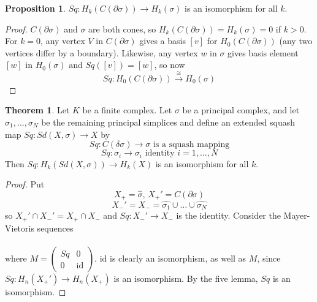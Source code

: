 \documentclass[a4paper,14pt]{extarticle}
\theoremstyle{definition}
\newtheorem*{theorem}{Theorem}
\newtheorem*{proposition}{Proposition}
\begin{document}
\begin{proposition}
	$Sq:H_k(C(\partial\sigma))\rightarrow H_k(\sigma)$ is an isomorphism for all $k$.
\end{proposition}

\begin{proof}
	$C(\partial\sigma)$ and $\sigma$ are both cones, so $H_k(C(\partial\sigma))=H_k(\sigma)=0$ if 
	$k>0$. For $k=0$, any vertex $V$ in $C(\partial\sigma)$ gives a basis $[v]$ for 
	$H_0(C(\partial\sigma))$ (any two vertices differ by a boundary). Likewise, any vertex $w$
	in $\sigma$ gives basis element $[w]$ in $H_0(\sigma)$ and $Sq([v])=[w]$, so now 
	\[Sq:H_0(C(\partial\sigma))\xrightarrow{\cong}H_0(\sigma)\]
\end{proof}

\begin{theorem}
	Let $K$ be a finite complex. Let $\sigma$ be a principal complex, and let 
	$\sigma_1,\ldots,\sigma_N$ be the remaining principal simplices and define an extended
	squash map $Sq:Sd(X,\sigma)\rightarrow X$ by 
	\[Sq:C(\delta\sigma)\rightarrow\sigma\text{ is a squash mapping}\]
	\[Sq:\sigma_i\rightarrow\sigma_i\text{ identity }i=1,\ldots,N\]
	Then $Sq:H_k(Sd(X,\sigma))\rightarrow H_k(X)$ is an isomorphism for all $k$.
\end{theorem}

\begin{proof}
	Put \[X_+=\hat{\sigma}, \,X_+'=C(\partial\sigma)\]
	\[X_-'=X_-=\hat{\sigma_1}\cup\ldots\cup\hat{\sigma_N}\] so $X_+'\cap X_-'=X_+\cap X_-$ and
	$Sq:X_-'\rightarrow X_-$ is the identity. Consider the Mayer-Vietoris sequences \\
	\vspace{12pt}
	 \\
	\vspace{12pt}
	where $M=\begin{pmatrix}Sq&0\\0&\text{id}\end{pmatrix}$. $\text{id}$ is clearly an
	isomorphism, as well as $M$, since $Sq:H_n(X_+')\rightarrow H_n(X_+)$ is an isomorphism.
	By the five lemma, $Sq$ is an	isomorphism.
\end{proof}
\end{document}
